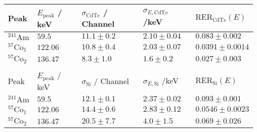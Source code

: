 	\begin{tabular}{|p{2cm}|p{2.5cm}|p{3cm}|p{3cm}|p{3cm}|}
		\hline
		\rowcolor{tabcolor}
		Peak   & $E_\mathrm{peak}$ / keV & $\sigma_\mathrm{CdTe}$ / Channel &             $\sigma_{E, \mathrm{CdTe}}$ /keV & $\mathrm{RER_{CdTe}}(E)$ \\ 
		\hline
		$^{241}\mathrm{Am}$ & $59.5$ & $11.1 \pm 0.2$ & $2.10 \pm 0.04$ & $0.083 \pm 0.002$\\ 
		$^{57}\mathrm{Co}_1$ & $122.06$ & $10.8 \pm 0.4$ & $2.03 \pm 0.07$ & $0.0391 \pm 0.0014$\\ 
		$^{57}\mathrm{Co}_2$ & $136.47$ & $8.3 \pm 1.0$ & $1.6 \pm 0.2$ & $0.027 \pm 0.003$\\ 
		\hline &&&&\\ 
		\hline
		\rowcolor{tabcolor}
		Peak   & $E_\mathrm{peak}$ / keV & $\sigma_\mathrm{Si}$ / Channel &             $\sigma_{E, \mathrm{Si}}$ /keV & $\mathrm{RER_{Si}}(E)$ \\ 
		\hline
		$^{241}\mathrm{Am}$ & $59.5$ & $12.1 \pm 0.1$ & $2.37 \pm 0.02$ & $0.093 \pm 0.001$\\ 
		$^{57}\mathrm{Co}_1$ & $122.06$ & $14.4 \pm 0.6$ & $2.83 \pm 0.12$ & $0.0546 \pm 0.0023$\\ 
		$^{57}\mathrm{Co}_2$ & $136.47$ & $20.5 \pm 7.7$ & $4.0 \pm 1.5$ & $0.069 \pm 0.026$\\ 
		\hline
	\end{tabular}
